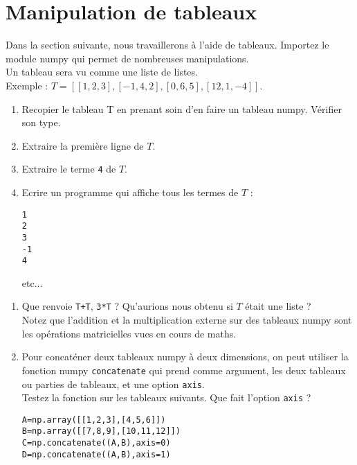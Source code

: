 \section{Manipulation de tableaux}
\begin{defn}
Dans la section suivante, nous travaillerons \` a l'aide de tableaux. Importez le module numpy qui permet de nombreuses manipulations.\\
Un tableau sera vu comme une liste de listes. \\
Exemple : $T=[[1,2,3],[-1,4,2],[0,6,5],[12,1,-4]]$.
\end{defn}

\begin{exercice}
\begin{enumerate}
\item Recopier le tableau T en prenant soin d'en faire un tableau numpy. Vérifier son type.
\item Extraire la premi\` ere ligne de $T$.
\item Extraire le terme \verb?4? de $T$.
\item Ecrire un programme qui affiche tous les termes de $T$ :
\begin{verbatim}
1
2
3
-1
4
\end{verbatim}
etc...
\end{enumerate}
\end{exercice}

\begin{exercice}
\begin{enumerate}
\item Que renvoie \verb?T+T?, \verb?3*T? ? Qu'aurions nous obtenu si $T$ était une liste ?\\
Notez que l'addition et la multiplication externe sur des tableaux numpy sont les opérations matricielles vues en cours de maths.
\item Pour concaténer deux tableaux numpy \` a deux dimensions, on peut utiliser la fonction numpy \verb?concatenate? qui prend comme argument, les deux tableaux ou parties de tableaux, et une option \verb?axis?.\\
Testez la fonction sur les tableaux suivants. Que fait l'option \verb?axis? ?
\begin{verbatim}
A=np.array([[1,2,3],[4,5,6]])
B=np.array([[7,8,9],[10,11,12]])
C=np.concatenate((A,B),axis=0)
D=np.concatenate((A,B),axis=1)
\end{verbatim}
\end{enumerate}
\end{exercice}


